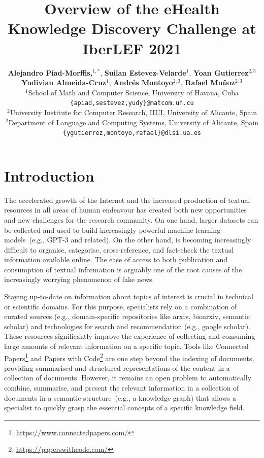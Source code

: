 \documentclass[a4paper,11pt,twocolumn,twoside]{article}
\title{Overview of the eHealth Knowledge Discovery Challenge at IberLEF 2021}
\author {
  \textbf{Alejandro Piad-Morffis,$^{1,*}$},
  \textbf{Suilan Estevez-Velarde$^1$},
  \textbf{Yoan Gutierrez$^{2,3}$}\\
  \textbf{Yudivian Almeida-Cruz$^1$},
  \textbf{Andrés Montoyo$^{2,3}$},
  \textbf{Rafael Muñoz$^{2,3}$}\\
$^1$School of Math and Computer Science, University of Havana, Cuba\\
\texttt{\{apiad,sestevez,yudy\}@matcom.uh.cu}\\
$^2$University Institute for Computer Research, IIUI, University of Alicante, Spain\\
$^2$Department of Language and Computing Systems, University of Alicante, Spain\\
\texttt{\{ygutierrez,montoyo,rafael\}@dlsi.ua.es}\\
}
\begin{document}


\label{firstpage} \maketitle

%

\section{Introduction}


The accelerated growth of the Internet and the increased production of textual resources in all areas of human endeavour has created both new opportunities and new challenges for the research community.
On one hand, larger datasets can be collected and used to build increasingly powerful machine learning models~(e.g., GPT-3 and related).
On the other hand, is becoming increasingly difficult to organise, categorise, cross-reference, and fact-check the textual information available online.
The ease of access to both publication and consumption of textual information is arguably one of the root causes of the increasingly worrying phenomenon of fake news.

Staying up-to-date on information about topics of interest is crucial in technical or scientific domains.
For this purpose, specialists rely on a combination of curated sources (e.g., domain-specific repositories like arxiv, bioarxiv, semantic scholar) and technologies for search and recommendation (e.g., google scholar).
These resources significantly improve the experience of collecting and consuming large amounts of relevant information on a specific topic.
Tools like Connected Papers\footnote{\url{https://www.connectedpapers.com/}} and Papers with Code\footnote{\url{https://paperswithcode.com/}} are one step beyond the indexing of documents, providing summarised and structured representations of the content in a collection of documents.
However, it remains an open problem to automatically combine, summarise, and present the relevant information in a collection of documents in a semantic structure~(e.g., a knowledge graph) that allows a specialist to quickly grasp the essential concepts of a specific knowledge field.
\end{document}
